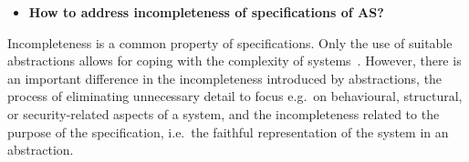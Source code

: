 \documentclass[sigconf,nonacm]{acmart}%
\begin{document}
	
\begin{itemize}[leftmargin=0.5cm]
		\item \textbf{How to address incompleteness of specifications of AS?}
	\end{itemize}
	Incompleteness is a common property of specifications. Only the use of suitable abstractions allows for coping with the complexity of systems~\citep{Kramer07}. However, there is an important difference in the incompleteness introduced by abstractions, the process of eliminating unnecessary detail to focus e.g.\ on behavioural, structural, or security-related aspects of a system, and the incompleteness related to the purpose of the specification, i.e.\ the faithful representation of the system in an abstraction.
	
\end{document}
